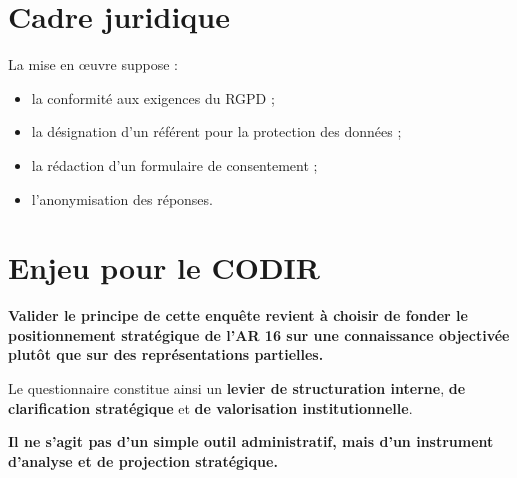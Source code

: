 \documentclass[12pt,a4paper]{article}
\begin{document}
\section{Cadre juridique}

La mise en œuvre suppose :

\begin{itemize}
    \item la conformité aux exigences du RGPD ;
    \item la désignation d'un référent pour la protection des données ;
    \item la rédaction d'un formulaire de consentement ;
    \item l'anonymisation des réponses.
\end{itemize}

\section{Enjeu pour le CODIR}

\textbf{Valider le principe de cette enquête revient à choisir de fonder le positionnement stratégique de l'AR 16 sur une connaissance objectivée plutôt que sur des représentations partielles.}

Le questionnaire constitue ainsi un \textbf{levier de structuration interne}, \textbf{de clarification stratégique} et \textbf{de valorisation institutionnelle}.

\bigskip

\noindent
\textbf{Il ne s'agit pas d'un simple outil administratif, mais d'un instrument d'analyse et de projection stratégique.}

\newpage

\printbibliography[heading=bibintoc,title={Références bibliographiques}]

\end{document}
